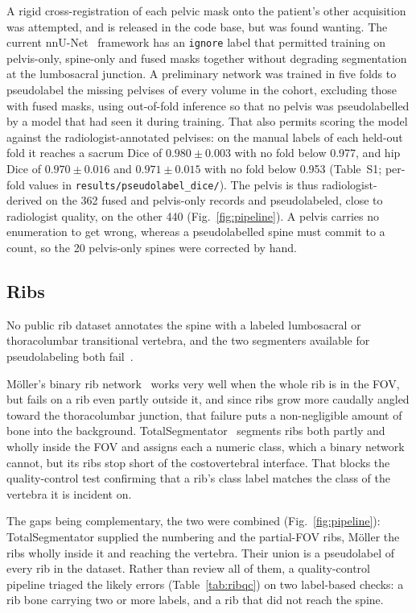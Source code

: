 \documentclass[aapm,mph,amsmath,amssymb,reprint]{revtex4-2}
\begin{document}
A rigid cross-registration of each pelvic mask onto the patient's other acquisition was
attempted, and is released in the code base, but was found wanting. The current
nnU-Net~\cite{nnunet} framework has an \texttt{ignore} label that permitted training on
pelvis-only, spine-only and fused masks together without degrading segmentation at the
lumbosacral junction. A preliminary network was trained in five folds to pseudolabel the
missing pelvises of every volume in the cohort, excluding those with fused masks, using
out-of-fold inference so that no pelvis was pseudolabelled by a model that had seen it during
training. That also permits scoring the model against the radiologist-annotated pelvises: on
the manual labels of each held-out fold it reaches a sacrum Dice of $0.980 \pm 0.003$ with no
fold below 0.977, and hip Dice of $0.970 \pm 0.016$ and $0.971 \pm 0.015$ with no fold below
0.953 (Table~S1; per-fold values in \texttt{results/pseudolabel\_dice/}). The pelvis is thus
radiologist-derived on the 362 fused and pelvis-only records and pseudolabeled, close to
radiologist quality, on the other 440 (Fig.~\ref{fig:pipeline}). A pelvis carries no enumeration to get wrong,
whereas a pseudolabelled spine must commit to a count, so the 20 pelvis-only spines were
corrected by hand.

\subsection{Ribs}

No public rib dataset annotates the spine with a labeled lumbosacral or thoracolumbar
transitional vertebra, and the two segmenters available for pseudolabeling both
fail~\cite{moller2026,totalsegmentator}.

Möller's binary rib network~\cite{moller2026} works very well when the whole rib is in the FOV,
but fails on a rib even partly outside it, and since ribs grow more caudally angled toward the
thoracolumbar junction, that failure puts a non-negligible amount of bone into the background.
TotalSegmentator~\cite{totalsegmentator} segments ribs both partly and wholly inside the FOV
and assigns each a numeric class, which a binary network cannot, but its ribs stop short of the
costovertebral interface. That blocks the quality-control test confirming that a rib's class
label matches the class of the vertebra it is incident on.

The gaps being complementary, the two were combined (Fig.~\ref{fig:pipeline}): TotalSegmentator
supplied the numbering and the partial-FOV ribs, Möller the ribs wholly inside it and reaching
the vertebra. Their union is a pseudolabel of every rib in the dataset. Rather than review all
of them, a quality-control pipeline triaged the likely errors (Table~\ref{tab:ribqc}) on two
label-based checks: a rib bone carrying two or more labels, and a rib that did not reach the
spine.
\end{document}
